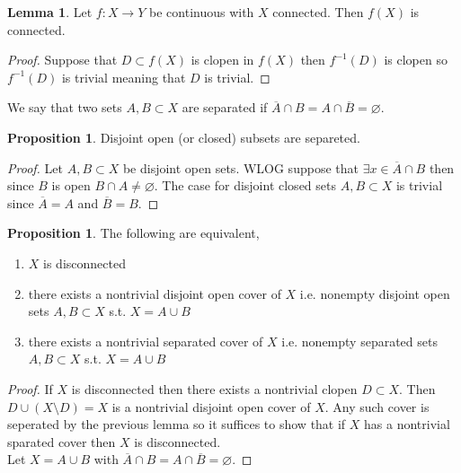 \documentclass[12pt]{extarticle}
\theoremstyle{definition}
\newtheorem{lemma}[theorem]{Lemma}
\newtheorem{proposition}[theorem]{Proposition}
\newenvironment{definition}[1][Definition:]{\begin{trivlist}
\item[\hskip \labelsep {\bfseries #1}]}{\end{trivlist}}
\begin{document}
\begin{lemma}
Let $f : X \to Y$ be continuous with $X$ connected. Then $f(X)$ is connected.
\end{lemma}

\begin{proof}
Suppose that $D \subset f(X)$ is clopen in $f(X)$ then $f^{-1}(D)$ is clopen so $f^{-1}(D)$ is trivial meaning that $D$ is trivial.
\end{proof}

\begin{definition}
We say that two sets $A, B \subset X$ are separated if $\overline{A} \cap B = A \cap \overline{B} = \varnothing$.
\end{definition}

\begin{proposition}
Disjoint open (or closed) subsets are separeted.
\end{proposition}

\begin{proof}
Let $A, B \subset X$ be disjoint open sets. WLOG suppose that $\exists x \in \overline{A} \cap B$ then since $B$ is open $B \cap A \neq \varnothing$.
The case for disjoint closed sets $A, B \subset X$ is trivial since $\overline{A} = A$ and $\overline{B} = B$.
\end{proof}

\begin{proposition}
The following are equivalent,
\begin{enumerate}
\item $X$ is disconnected
\item there exists a nontrivial disjoint open cover of $X$ i.e. nonempty disjoint open sets $A,B \subset X$ s.t. $X = A \cup B$
\item there exists a nontrivial separated cover of $X$ i.e. nonempty separated sets $A,B \subset X$ s.t. $X = A \cup B$
\end{enumerate}
\end{proposition}

\begin{proof}
If $X$ is disconnected then there exists a nontrivial clopen $D \subset X$. Then $D \cup (X \setminus D) = X$ is a nontrivial disjoint open cover of $X$. Any such cover is seperated by the previous lemma so it suffices to show that if $X$ has a nontrivial sparated cover then $X$ is disconnected.
\bigskip\\
Let $X = A \cup B$ with $\overline{A} \cap B = A \cap \overline{B} = \varnothing$.
\end{proof}
\end{document}
